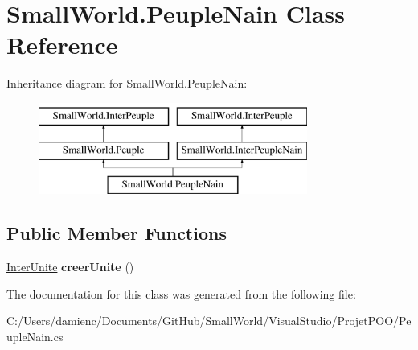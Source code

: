 \hypertarget{class_small_world_1_1_peuple_nain}{\section{Small\-World.\-Peuple\-Nain Class Reference}
\label{class_small_world_1_1_peuple_nain}
}
Inheritance diagram for Small\-World.\-Peuple\-Nain\-:\begin{figure}[H]
\begin{center}
\leavevmode
\includegraphics[height=3.000000cm]{class_small_world_1_1_peuple_nain}
\end{center}
\end{figure}
\subsection*{Public Member Functions}
\begin{DoxyCompactItemize}
\item 
\hypertarget{class_small_world_1_1_peuple_nain_a67fc235b5f8260944db8562cda6980dc}{\hyperlink{interface_small_world_1_1_inter_unite}{Inter\-Unite} {\bfseries creer\-Unite} ()}\label{class_small_world_1_1_peuple_nain_a67fc235b5f8260944db8562cda6980dc}

\end{DoxyCompactItemize}


The documentation for this class was generated from the following file\-:\begin{DoxyCompactItemize}
\item 
C\-:/\-Users/damienc/\-Documents/\-Git\-Hub/\-Small\-World/\-Visual\-Studio/\-Projet\-P\-O\-O/Peuple\-Nain.\-cs\end{DoxyCompactItemize}
